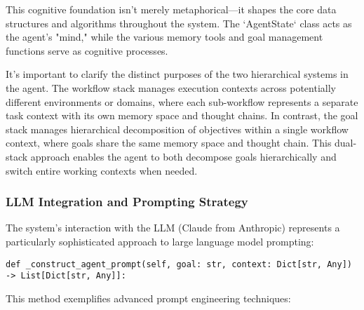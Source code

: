 \documentclass[12pt,a4paper]{article}
\begin{document}
This cognitive foundation isn't merely metaphorical—it shapes the core data structures and algorithms throughout the system. The `AgentState` class acts as the agent's "mind," while the various memory tools and goal management functions serve as cognitive processes.

It's important to clarify the distinct purposes of the two hierarchical systems in the agent. The workflow stack manages execution contexts across potentially different environments or domains, where each sub-workflow represents a separate task context with its own memory space and thought chains. In contrast, the goal stack manages hierarchical decomposition of objectives within a single workflow context, where goals share the same memory space and thought chain. This dual-stack approach enables the agent to both decompose goals hierarchically and switch entire working contexts when needed.

\subsubsection*{LLM Integration and Prompting Strategy}

The system's interaction with the LLM (Claude from Anthropic) represents a particularly sophisticated approach to large language model prompting:
\begin{pageablecode}
\begin{verbatim}
def _construct_agent_prompt(self, goal: str, context: Dict[str, Any]) -> List[Dict[str, Any]]:
\end{verbatim}
\end{pageablecode}
This method exemplifies advanced prompt engineering techniques:
\end{document}
